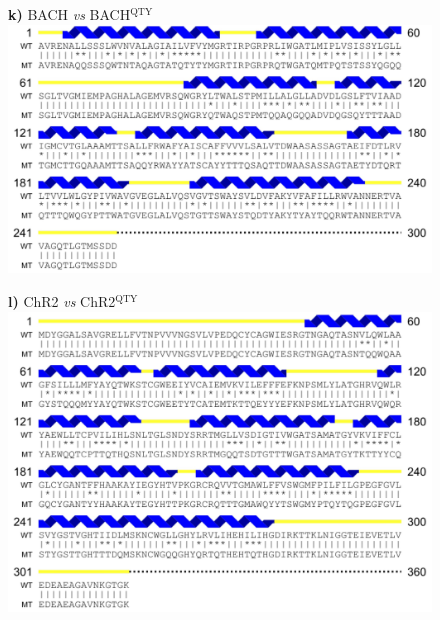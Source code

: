 \documentclass[fleqn,12pt]{supp}
\begin{document}
\newpage
\begin{figure}[H]
    \textbf{k)} BACH \textit{vs} BACH$^{\textrm{QTY}}$ \\
    \includegraphics[width=\linewidth]{FigureS1k.jpg}
\end{figure}

\newpage
\begin{figure}[H]
    \textbf{l)} ChR2 \textit{vs} ChR2$^{\textrm{QTY}}$ \\
    \includegraphics[width=\linewidth]{FigureS1l.jpg}
\end{figure}
\end{document}
